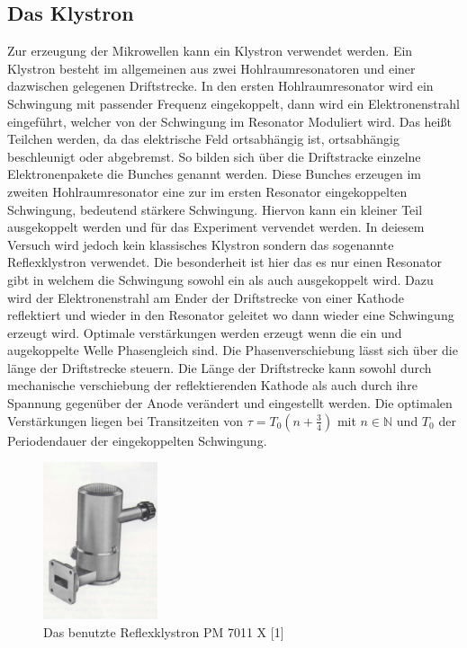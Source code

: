 \subsection{Das Klystron}
\label{sec:thklystron}
Zur erzeugung der Mikrowellen kann ein Klystron verwendet werden. Ein Klystron besteht im allgemeinen 
aus zwei Hohlraumresonatoren und einer dazwischen gelegenen Driftstrecke. In den ersten Hohlraumresonator 
wird ein Schwingung mit passender Frequenz eingekoppelt, dann wird ein Elektronenstrahl eingeführt, welcher 
von der Schwingung im Resonator Moduliert wird. Das heißt Teilchen werden, da das elektrische Feld ortsabhängig
ist, ortsabhängig beschleunigt oder abgebremst. So bilden sich über die Driftstracke 
einzelne Elektronenpakete die Bunches genannt werden. Diese Bunches erzeugen im zweiten Hohlraumresonator eine
zur im ersten Resonator eingekoppelten Schwingung, bedeutend stärkere Schwingung. Hiervon kann ein kleiner Teil 
ausgekoppelt werden und für das Experiment vervendet werden. In deiesem Versuch wird jedoch kein klassisches
Klystron sondern das sogenannte Reflexklystron verwendet. Die besonderheit ist hier das es nur einen Resonator 
gibt in welchem die Schwingung sowohl ein als auch ausgekoppelt wird. Dazu wird der Elektronenstrahl am Ender der 
Driftstrecke von einer Kathode reflektiert und wieder in den Resonator geleitet wo dann wieder eine Schwingung
erzeugt wird. Optimale verstärkungen werden erzeugt wenn die ein und augekoppelte Welle Phasengleich sind. 
Die Phasenverschiebung lässt sich über die länge der Driftstrecke steuern. Die Länge der Driftstrecke kann 
sowohl durch mechanische verschiebung der reflektierenden Kathode als auch durch ihre Spannung gegenüber 
der Anode verändert und eingestellt werden. Die optimalen Verstärkungen liegen bei Transitzeiten von
$\tau=T_0(n+\frac{3}{4})$ mit $n \in \mathbb{N}$ und $T_0$ der Periodendauer der eingekoppelten Schwingung.

\begin{figure}
    \centering
    \includegraphics[width=0.3\textwidth,angle=0]{content/grafiken/Klystron.PNG}
    \caption{Das benutzte Reflexklystron PM 7011 X [1]}
    \label{fig:Klystron}
  \end{figure}

